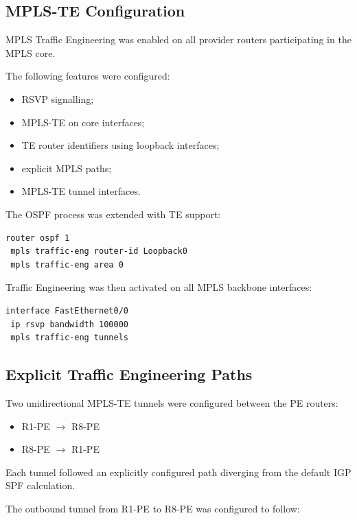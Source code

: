\documentclass[12pt]{article}
\begin{document}
\subsection{MPLS-TE Configuration}

MPLS Traffic Engineering was enabled on all provider routers participating in the MPLS core.

The following features were configured:
\begin{itemize}
    \item RSVP signalling;
    \item MPLS-TE on core interfaces;
    \item TE router identifiers using loopback interfaces;
    \item explicit MPLS paths;
    \item MPLS-TE tunnel interfaces.
\end{itemize}

The OSPF process was extended with TE support:

\begin{lstlisting}
router ospf 1
 mpls traffic-eng router-id Loopback0
 mpls traffic-eng area 0
\end{lstlisting}

Traffic Engineering was then activated on all MPLS backbone interfaces:

\begin{lstlisting}
interface FastEthernet0/0
 ip rsvp bandwidth 100000
 mpls traffic-eng tunnels
\end{lstlisting}

\subsection{Explicit Traffic Engineering Paths}

Two unidirectional MPLS-TE tunnels were configured between the PE routers:
\begin{itemize}
    \item R1-PE $\rightarrow$ R8-PE
    \item R8-PE $\rightarrow$ R1-PE
\end{itemize}

Each tunnel followed an explicitly configured path diverging from the default IGP SPF calculation.

The outbound tunnel from R1-PE to R8-PE was configured to follow:
\end{document}
